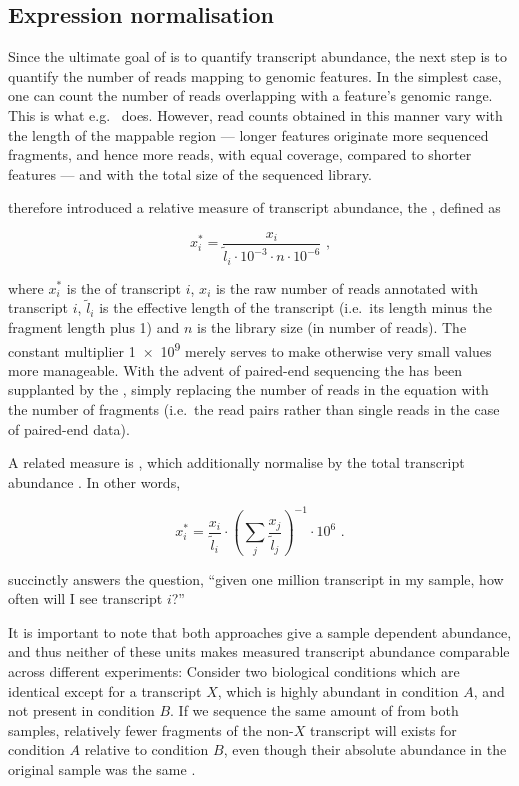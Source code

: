 \subsection{Expression normalisation}

Since the ultimate goal of \rnaseq is to quantify transcript abundance, the next
step is to quantify the number of reads mapping to genomic features. In the
simplest case, one can count the number of reads overlapping with a feature’s
genomic range. This is what e.g.\  \citep{Anders:2014} does.
However, read counts obtained in this manner vary with the length of the
mappable region --- longer features originate more sequenced fragments, and
hence more reads, with equal coverage, compared to shorter features --- and with
the total size of the sequenced library.

\cite{Mortazavi:2008} therefore introduced a relative measure of transcript
abundance, the \rpkm, defined as

\begin{equation}
    x^*_i = \frac{x_i}{\tilde l_i \cdot 10^{-3} \cdot n \cdot 10^{-6}}
        \text{\ ,}
\end{equation}

where \(x^*_i\) is the \rpkm of transcript \(i\), \(x_i\) is the raw  number of
reads annotated with transcript \(i\), \(\tilde l_i\) is the effective length of
the transcript (i.e.\ its length minus the fragment length plus \num{1}) and
\(n\) is the library size (in number of reads). The constant multiplier
\num{1e9} merely serves to make otherwise very small values more manageable.
With the advent of paired-end sequencing the \rpkm has been supplanted by the
\fpkm, simply replacing the number of reads in the equation with the number of
fragments (i.e.\ the read pairs rather than single reads in the case of
paired-end data).

A related measure is \tpm, which additionally normalise by the total transcript
abundance \citep{Li:2010}. In other words,

\begin{equation}
    x^*_i = \frac{x_i}{\tilde l_i} \cdot \left(\sum_j{\frac{x_j}{\tilde
        l_j}}\right)^{-1} \cdot 10^6 \text{\ .}
\end{equation}

\tpm succinctly answers the question, “given one million transcript in my
sample, how often will I see transcript \(i\)?”

It is important to note that both approaches give a sample dependent abundance,
and thus neither of these units makes measured transcript abundance comparable
across different experiments: Consider two biological conditions which are
identical except for a transcript \(X\), which is highly abundant in condition
\(A\), and not present in condition \(B\). If we sequence the same amount of
\mrna from both samples, relatively fewer fragments of the non-\(X\) transcript
will exists for condition \(A\) relative to condition \(B\), even though
their absolute abundance in the original sample was the same
\citep{Robinson:2010a}.

